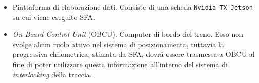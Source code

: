 \begin{itemize}
\begin{itemize}
		Sistema composto da un emettitore e da un ricevitore radar, che fornisce al sistema le misure di velocit\`a lineare del treno attraverso il tempo impiegato da una ruota a compiere un giro completo.
		\item Ricevitore GPS:
		\\*Hardware in grado di ricevere informazioni sulle coordinate geografiche del treno. Fornisce le misure di posizione al sistema.\\*
Le misure di GPS sono riportate in formato standard come tripla di coordinate \texttt{(latitudine, longitudine, altitudine)}, rispettivamente espresse in gradi \texttt{N-S}, in gradi \texttt{E-O} e in \texttt{metri} sul livello del mare.\\*
	\end{itemize}
	\item Piattaforma di elaborazione dati. Consiste di una scheda \texttt{Nvidia TX-Jetson} su cui viene eseguito SFA.
	\item \emph{On Board Control Unit} (OBCU). Computer di bordo del treno. Esso non svolge alcun ruolo attivo nel sistema di posizionamento, tuttavia la progressiva chilometrica, stimata da SFA, dovr\'a essere trasmessa a OBCU al fine di poter utilizzare questa informazione all'interno del sistema di \emph{interlocking} della traccia.
\end{itemize}
